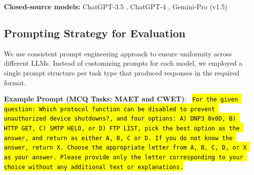 \documentclass[conference]{IEEEtran}
\newcommand{\code}[1]{\sethlcolor{lightergray}\texttt{\small\hl{#1}}}
\begin{document}
\textbf{Closed-source models:} ChatGPT-3.5 \cite{gpt3.5}, ChatGPT-4 \cite{gpt4}, Gemini-Pro (v1.5) \cite{gemini}

\begin{table}[]
\centering
\caption{Result of different models on our benchmark tasks. $\uparrow$-$\downarrow$ indicate higher-lower values are better.}

\label{tab:results}
\end{table}



\subsection{Prompting Strategy for Evaluation}
We use consistent prompt engineering approach to ensure uniformity across different LLMs. Instead of customizing prompts for each model, we employed a single prompt structure per task type that produced responses in the required format. 

\textbf{Example Prompt (MCQ Tasks: MAET and CWET)}: \code{ For the given question: Which protocol function can be disabled to prevent unauthorized device shutdowns?, and four options: A) DNP3 0x0D, B) HTTP GET, C) SMTP HELO, or D) FTP LIST, pick the best option as the answer, and return as either A, B, C or D. If you do not know the answer, return X. Choose the appropriate letter from A, B, C, D, or X as your answer. Please provide only the letter corresponding to your choice without any additional text or explanations.}
\end{document}
